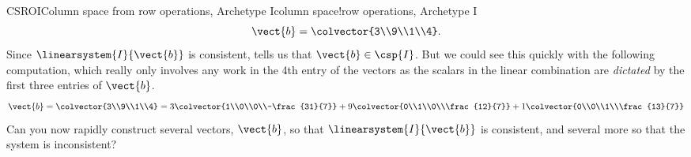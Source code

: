\begin{example}{CSROI}{Column space from row operations, Archetype I}{column space!row operations, Archetype I}
%
\begin{equation*}
\vect{b}=\colvector{3\\9\\1\\4}.
\end{equation*}
%
Since $\linearsystem{I}{\vect{b}}$ is consistent,  tells us that $\vect{b}\in\csp{I}$.  But we could see this quickly with the following computation, which really only involves any work in the 4th entry of the vectors as the scalars in the linear combination are {\em dictated} by the first three entries of $\vect{b}$.
%
\begin{equation*}
\vect{b}=\colvector{3\\9\\1\\4}=
3\colvector{1\\0\\0\\-\frac{31}{7}}+
9\colvector{0\\1\\0\\\frac{12}{7}}+
1\colvector{0\\0\\1\\\frac{13}{7}}
\end{equation*}
%
Can you now rapidly construct several vectors, $\vect{b}$, so that $\linearsystem{I}{\vect{b}}$ is consistent, and several more so that the system is inconsistent?
%
\end{example}
%

